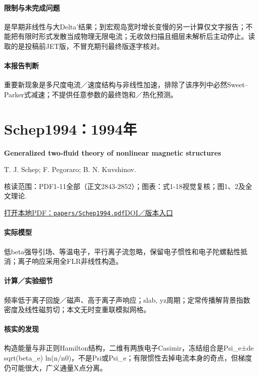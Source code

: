 \paragraph{限制与未完成问题}是早期非线性与大Delta'结果；到宏观岛宽时增长变慢的另一计算仅文字报告；不能把有限时形式发散当成物理无限电流；无收敛扫描且细层未解析后主动停止。读取的是投稿前JET版，不冒充期刊最终版逐字核对。

\paragraph{本报告判断}重要新现象是多尺度电流／速度结构与非线性加速，排除了该序列中必然Sweet–Parker式减速；不提供任意参数的最终饱和／热化预测。

\section{Schep1994：1994年}\label{paper:Schep1994}

\textbf{Generalized two-fluid theory of nonlinear magnetic structures}\citep{Schep1994}\

T. J. Schep;  F. Pegoraro;  B. N. Kuvshinov.

\textsf{核读范围：}PDF1-11全部（正文2843-2852）；\textsf{图表：}式1-18视觉复核；图1、2及全文理论.

\href{run:papers/Schep1994.pdf}{打开本地PDF：\texttt{papers/Schep1994.pdf}}\quad\href{https://doi.org/10.1063/1.870523}{DOI／版本入口}

\paragraph{实际模型}低beta强导引场、等温电子，平行离子流忽略，保留电子惯性和电子陀螺黏性抵消；离子响应采用全FLR非线性构造。

\paragraph{计算／实验细节}频率低于离子回旋／磁声、高于离子声响应；slab, yz周期；定常传播解背景指数密度及线性磁剪切；本文无时变重联模拟网格。

\paragraph{核实的发现}构造能量与非正则Hamilton结构，二维有两族电子Casimir，冻结组合是Psi\_e±de sqrt(beta\_e) ln(n/n0)，不是Psi或Psi\_e；有限惯性去掉电流本身的奇点，但梯度仍可能很大，广义通量X点分离。

